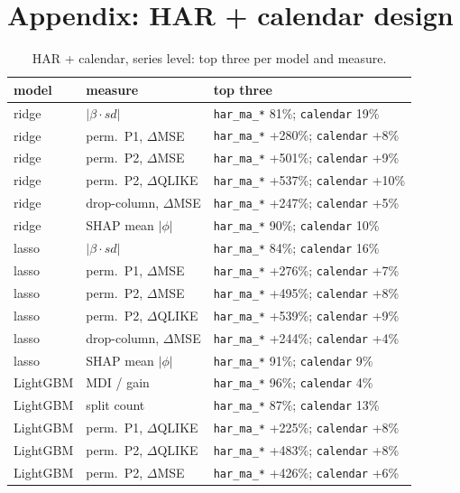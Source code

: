 \documentclass[10pt]{article}
\begin{document}
\appendix
\section*{Appendix: HAR + calendar design}
\begin{table}[H]\centering\scriptsize
\caption{HAR + calendar, series level: top three per model and measure.}
\begin{tabular}{llp{11.2cm}}\toprule
model & measure & top three\\\midrule
ridge & $|\beta\cdot sd|$ & \texttt{har\_ma\_*} 81\%; \texttt{calendar} 19\% \\
ridge & perm.\ P1, $\Delta$MSE & \texttt{har\_ma\_*} +280\%; \texttt{calendar} +8\% \\
ridge & perm.\ P2, $\Delta$MSE & \texttt{har\_ma\_*} +501\%; \texttt{calendar} +9\% \\
ridge & perm.\ P2, $\Delta$QLIKE & \texttt{har\_ma\_*} +537\%; \texttt{calendar} +10\% \\
ridge & drop-column, $\Delta$MSE & \texttt{har\_ma\_*} +247\%; \texttt{calendar} +5\% \\
ridge & SHAP mean $|\phi|$ & \texttt{har\_ma\_*} 90\%; \texttt{calendar} 10\% \\
lasso & $|\beta\cdot sd|$ & \texttt{har\_ma\_*} 84\%; \texttt{calendar} 16\% \\
lasso & perm.\ P1, $\Delta$MSE & \texttt{har\_ma\_*} +276\%; \texttt{calendar} +7\% \\
lasso & perm.\ P2, $\Delta$MSE & \texttt{har\_ma\_*} +495\%; \texttt{calendar} +8\% \\
lasso & perm.\ P2, $\Delta$QLIKE & \texttt{har\_ma\_*} +539\%; \texttt{calendar} +9\% \\
lasso & drop-column, $\Delta$MSE & \texttt{har\_ma\_*} +244\%; \texttt{calendar} +4\% \\
lasso & SHAP mean $|\phi|$ & \texttt{har\_ma\_*} 91\%; \texttt{calendar} 9\% \\
LightGBM & MDI / gain & \texttt{har\_ma\_*} 96\%; \texttt{calendar} 4\% \\
LightGBM & split count & \texttt{har\_ma\_*} 87\%; \texttt{calendar} 13\% \\
LightGBM & perm.\ P1, $\Delta$QLIKE & \texttt{har\_ma\_*} +225\%; \texttt{calendar} +8\% \\
LightGBM & perm.\ P2, $\Delta$QLIKE & \texttt{har\_ma\_*} +483\%; \texttt{calendar} +8\% \\
LightGBM & perm.\ P2, $\Delta$MSE & \texttt{har\_ma\_*} +426\%; \texttt{calendar} +6\% \\

\end{tabular}
\end{table}
\end{document}
